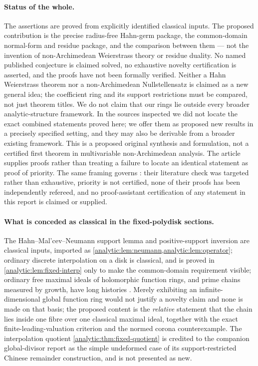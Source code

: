 \documentclass[11pt,letterpaper]{article}
\theoremstyle{definition}
\theoremstyle{remark}
\numberwithin{equation}{section}
\begin{document}
\paragraph{Status of the whole.}
The assertions are proved from explicitly identified classical inputs. The
proposed contribution is the precise radius-free Hahn-germ package, the
common-domain normal-form and residue package, and the comparison between
them --- not the invention of non-Archimedean Weierstrass theory or residue
duality. No named published conjecture is claimed solved, no exhaustive
novelty certification is asserted, and the proofs have not been formally
verified. Neither a Hahn Weierstrass theorem nor a non-Archimedean
Nullstellensatz is claimed as a new general idea; the coefficient ring and
its support restrictions must be compared, not just theorem titles. We do
not claim that our rings lie outside every broader analytic-structure
framework. In the sources inspected we did not locate the exact combined
statements proved here; we offer them as proposed new results in a precisely
specified setting, and they may also be derivable from a broader existing
framework. This is a proposed original synthesis and formulation, not a
certified first theorem in multivariable non-Archimedean analysis. The
article supplies proofs rather than treating a failure to locate an
identical statement as proof of priority. The same framing governs
: their
literature check was targeted rather than exhaustive, priority is not
certified, none of their proofs has been independently refereed, and no
proof-assistant certification of any statement in this report is claimed or
supplied.

\paragraph{What is conceded as classical in the fixed-polydisk sections.}
The Hahn--Mal'cev--Neumann support lemma and positive-support inversion are
classical inputs, imported as
\cref{analytic:lem:neumann,analytic:lem:operator}; ordinary discrete
interpolation on a disk is classical, and is proved in
\cref{analytic:lem:fixed-interp} only to make the common-domain requirement
visible; ordinary free maximal ideals of holomorphic function rings, and
prime chains measured by growth, have long histories
\cite{Henriksen52,Henriksen53,KangToan}. Merely exhibiting an
infinite-dimensional global function ring would not justify a novelty claim
and none is made on that basis; the proposed content is the
\emph{relative} statement that the chain lies inside one fibre over one
classical maximal ideal, together with the exact finite-leading-valuation
criterion and the normed corona counterexample. The interpolation quotient
\cref{analytic:thm:fixed-quotient} is credited to the companion global-divisor
report \cite[\S10]{GlobalDivisors} as the simple undeformed case of its
support-restricted Chinese remainder construction, and is not presented as
new.
\end{document}
